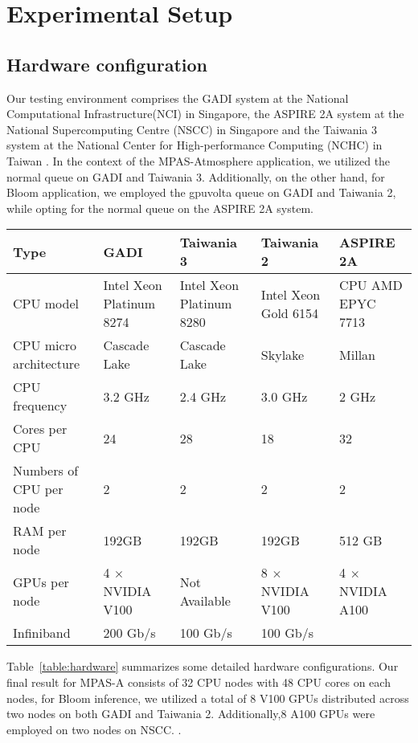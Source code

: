 \section{Experimental Setup}
\label{sec:exp-setup}

\subsection{Hardware configuration}
Our testing environment comprises the GADI system at the National Computational Infrastructure(NCI) in Singapore, the ASPIRE 2A system  at  the National Supercomputing Centre (NSCC) in Singapore and the Taiwania 3 system at the National Center for High-performance Computing (NCHC) in Taiwan . In the context of the MPAS-Atmosphere application, we utilized the normal queue on GADI and Taiwania 3. Additionally, on the other hand, for Bloom application, we employed the gpuvolta queue on GADI and Taiwania 2, while opting for the normal queue on the ASPIRE 2A system.

\begin{table*}[t]
    \centering
    \caption{The cluster hardware configuration}
    \begin{tabular}{l|llll}
        \toprule
        Type & GADI & Taiwania 3  & Taiwania 2 & ASPIRE 2A\\
        \midrule
        CPU model & Intel Xeon Platinum 8274 & Intel Xeon Platinum 8280 & Intel Xeon Gold 6154 & CPU AMD EPYC 7713\\
        CPU micro architecture & Cascade Lake & Cascade Lake & Skylake & Millan \\
        CPU frequency & 3.2 GHz & 2.4 GHz & 3.0 GHz & 2 GHz\\
        Cores per CPU & 24 & 28 & 18 & 32\\
        Numbers of CPU per node & 2 & 2 & 2 & 2\\
        RAM per node & 192GB & 192GB & 192GB &  512 GB   \\
        GPUs per node &  4 $\times$ NVIDIA V100 & Not Available & 8 $\times$ NVIDIA V100 & 4 $\times$ NVIDIA A100 \\
        Infiniband    & 200 Gb/s & 100 Gb/s & 100 Gb/s  \\
        \bottomrule
    \end{tabular}
    \label{table:hardware}
\end{table*}

Table~\ref{table:hardware} summarizes some detailed hardware configurations. Our final result for MPAS-A consists of 32 CPU nodes with 48 CPU cores on each nodes, for Bloom inference, we utilized a total of 8 V100 GPUs distributed across two nodes on both GADI and Taiwania 2. Additionally,8 A100 GPUs were employed on two nodes on NSCC. . 


